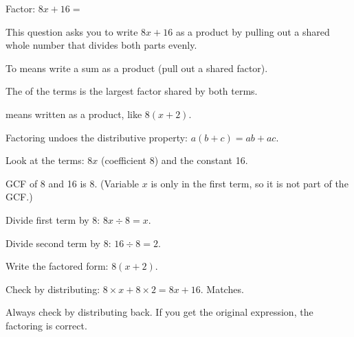 
Factor: $8x + 16 = $\ansblank


This question asks you to write $8x + 16$ as a product by pulling out a shared whole number that divides both parts evenly.

\begin{words}
  \item To means write a sum as a product (pull out a shared factor).
  \item The of the terms is the largest factor shared by both terms.
  \item {}means written as a product, like $8(x + 2)$.
  \item Factoring undoes the distributive property: $a(b + c) = ab + ac$.
\end{words}

\begin{steps}
  \item Look at the terms: $8x$ (coefficient 8) and the constant 16.
  \item GCF of 8 and 16 is 8. (Variable $x$ is only in the first term, so it is not part of the GCF.)
  \item Divide first term by 8: $8x \div 8 = x$.
  \item Divide second term by 8: $16 \div 8 = 2$.
  \item Write the factored form: $8(x + 2)$.
  \item Check by distributing: $8 \times x + 8 \times 2 = 8x + 16$. Matches.
\end{steps}


Always check by distributing back. If you get the original expression, the factoring is correct.
